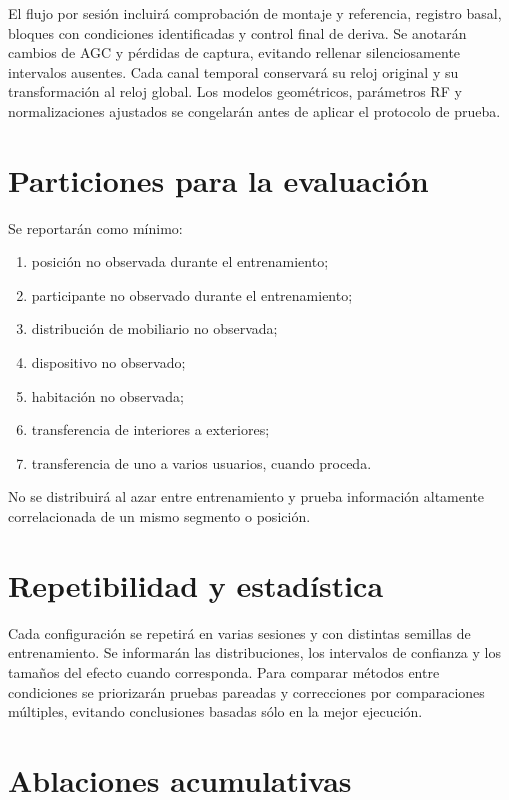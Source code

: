 El flujo por sesión incluirá comprobación de montaje y referencia, registro basal,
bloques con condiciones identificadas y control final de deriva. Se anotarán cambios
de AGC y pérdidas de captura, evitando rellenar silenciosamente intervalos ausentes.
Cada canal temporal conservará su reloj original y su transformación al reloj global.
Los modelos geométricos, parámetros RF y normalizaciones ajustados se congelarán antes
de aplicar el protocolo de prueba.

\section{Particiones para la evaluación}

Se reportarán como mínimo:
\begin{enumerate}
\item posición no observada durante el entrenamiento;
\item participante no observado durante el entrenamiento;
\item distribución de mobiliario no observada;
\item dispositivo no observado;
\item habitación no observada;
\item transferencia de interiores a exteriores;
\item transferencia de uno a varios usuarios, cuando proceda.
\end{enumerate}
No se distribuirá al azar entre entrenamiento y prueba información altamente correlacionada de un mismo segmento o posición.

\section{Repetibilidad y estadística}

Cada configuración se repetirá en varias sesiones y con distintas semillas de entrenamiento. Se informarán las distribuciones, los intervalos de confianza y los tamaños del efecto cuando corresponda. Para comparar métodos entre condiciones se priorizarán pruebas pareadas y correcciones por comparaciones múltiples, evitando conclusiones basadas sólo en la mejor ejecución.

\section{Ablaciones acumulativas}

